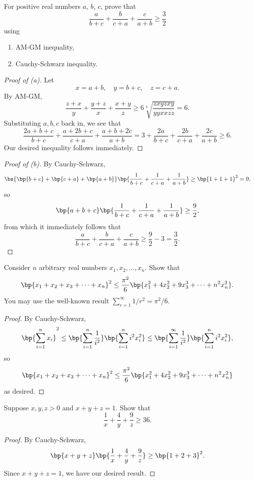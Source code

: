\begin{problem}
    For positive real numbers $a$, $b$, $c$, prove that \[\frac{a}{b + c} + \frac{b}{c + a} + \frac{c}{a + b} \geq \frac32\] using
    \begin{enumerate}
        \item AM-GM inequality,
        \item Cauchy-Schwarz inequality.
    \end{enumerate}
\end{problem}
\begin{proof}[Proof of \emph{(a)}]
    Let \[x = a + b, \quad y = b + c, \quad z = c + a.\] By AM-GM, \[\frac{z + x}{y} + \frac{y + z}{x} + \frac{x + y}{z} \geq 6 \sqrt[6]{\frac{zxyzxy}{yyxxzz}} = 6.\] Substituting $a, b, c$ back in, we see that \[\frac{2a + b + c}{b + c} + \frac{a + 2b + c}{c + a} + \frac{a + b + 2c}{a + b} = 3 + \frac{2a}{b + c} + \frac{2b}{c + a} + \frac{2c}{a + b} \geq 6.\] Our desired inequality follows immediately.
\end{proof}
\begin{proof}[Proof of \emph{(b)}]
    By Cauchy-Schwarz, \[\bs{\bp{b+c} + \bp{c + a} + \bp{a + b}}\bp{\frac1{b+c} + \frac1{c+a} + \frac1{a+b}} \geq \bp{1 + 1 + 1}^2 = 9,\] so \[\bp{a + b + c}\bp{\frac1{b+c} + \frac1{c+a} + \frac1{a+b}} \geq \frac92,\] from which it immediately follows that \[\frac{a}{b + c} + \frac{b}{c + a} + \frac{c}{a + b} \geq \frac92 - 3 = \frac32.\]
\end{proof}

\begin{problem}
    Consider $n$ arbitrary real numbers $x_1, x_2, \dots, x_n$. Show that \[\bp{x_1 + x_2 + x_3 + \dots + x_n}^2 \leq \frac{\pi^2}{6} \bp{x_1^2 + 4x_2^2 + 9x_3^3 + \dots + n^2x_n^2}.\] You may use the well-known result $\sum_{r = 1}^\infty 1/r^2 = \pi^2/6$.
\end{problem}
\begin{proof}
    By Cauchy-Schwarz, \[\bp{\sum_{i = 1}^n x_i}^2 \leq \bp{\sum_{i = 1}^n \frac1{i^2}}\bp{\sum_{i = 1}^n i^2 x_i^2} \leq \bp{\sum_{i = 1}^\infty \frac1{i^2}} \bp{\sum_{i = 1}^n i^2 x_i^2},\] so \[\bp{x_1 + x_2 + x_3 + \dots + x_n}^2 \leq \frac{\pi^2}{6} \bp{x_1^2 + 4x_2^2 + 9x_3^3 + \dots + n^2x_n^2}\] as desired.
\end{proof}

\begin{problem}
    Suppose $x, y, z > 0$ and $x + y + z = 1$. Show that \[\frac1x + \frac4y + \frac9z \geq 36.\]
\end{problem}
\begin{proof}
    By Cauchy-Schwarz, \[\bp{x + y + z}\bp{\frac1x + \frac4y + \frac9z} \geq \bp{1 + 2 + 3}^2.\] Since $x + y + z = 1$, we have our desired result.
\end{proof}

